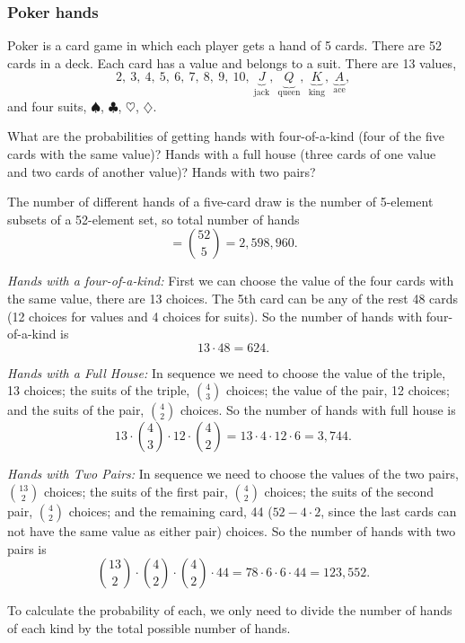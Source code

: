 \subsubsection{Poker hands}

Poker is a card game in which each player gets a hand of 5 cards. There are 52 cards in
a deck. Each card has a value and belongs to a suit. There are 13 values,
\[
2,\ 3,\ 4,\ 5,\ 6,\ 7,\ 8,\ 9,\ 10,\
\underbrace{J}_{\text{jack}},\
\underbrace{Q}_{\text{queen}},\
\underbrace{K}_{\text{king}},\
\underbrace{A}_{\text{ace}},
\]
and four suits, $\spadesuit$, $\clubsuit$, $\heartsuit$, $\diamondsuit$.

\begin{problem}{What are the probabilities of getting hands with four-of-a-kind (four of the five cards with the same value)? Hands with a full house (three cards of one value and two cards of another value)? Hands with two pairs?}
\end{problem}
\begin{solution}
The number of different hands of a five-card draw is the number of 5-element subsets
of a 52-element set, so total number of hands
\[
=\binom{52}{5}=2,598,960.
\]

\noindent\emph{Hands with a four-of-a-kind:} First we can choose the value of the four
cards with the same value, there are 13 choices. The 5th card can be any of the rest 48
cards (12 choices for values and 4 choices for suits). So the number of hands with
four-of-a-kind is
\[
13\cdot48=624.
\]

\noindent\emph{Hands with a Full House:} In sequence we need to choose the value of the
triple, 13 choices; the suits of the triple, $\binom{4}{3}$ choices; the value of the
pair, 12 choices; and the suits of the pair, $\binom{4}{2}$ choices. So the number of
hands with full house is
\[
13\cdot\binom{4}{3}\cdot12\cdot\binom{4}{2}
=13\cdot4\cdot12\cdot6=3,744.
\]

\noindent\emph{Hands with Two Pairs:} In sequence we need to choose the values of the
two pairs, $\binom{13}{2}$ choices; the suits of the first pair, $\binom{4}{2}$ choices;
the suits of the second pair, $\binom{4}{2}$ choices; and the remaining card, 44
($52-4\cdot2$, since the last cards can not have the same value as either pair)
choices. So the number of hands with two pairs is
\[
\binom{13}{2}\cdot\binom{4}{2}\cdot\binom{4}{2}\cdot44
=78\cdot6\cdot6\cdot44=123,552.
\]

To calculate the probability of each, we only need to divide the number of hands of each
kind by the total possible number of hands.
\end{solution}


